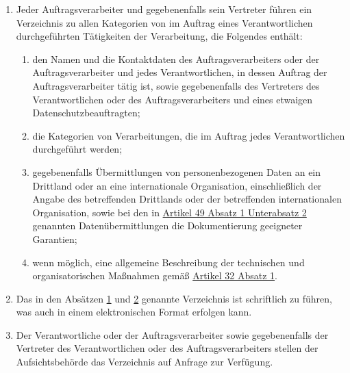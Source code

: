\begin{enumerate}
\begin{enumerate}
  \end{enumerate}

  \item Jeder Auftragsverarbeiter und gegebenenfalls sein Vertreter führen ein Verzeichnis zu allen Kategorien von im
   Auftrag eines Verantwortlichen durchgeführten Tätigkeiten der Verarbeitung, die Folgendes enthält:
  \label{itm:30-2}

  \begin{enumerate}
  
    \item den Namen und die Kontaktdaten des Auftragsverarbeiters oder der Auftragsverarbeiter und jedes
     Verantwortlichen, in dessen Auftrag der Auftragsverarbeiter tätig ist, sowie gegebenenfalls des Vertreters des
     Verantwortlichen oder des Auftragsverarbeiters und eines etwaigen Datenschutzbeauftragten;
    \label{itm:30-2a}

    \item die Kategorien von Verarbeitungen, die im Auftrag jedes Verantwortlichen durchgeführt werden;
    \label{itm:30-2b}

    \item gegebenenfalls Übermittlungen von personenbezogenen Daten an ein Drittland oder an eine internationale
     Organisation, einschließlich der Angabe des betreffenden Drittlands oder der betreffenden internationalen
     Organisation, sowie bei den in \hyperref[itm:49-1-2]{Artikel 49 Absatz 1 Unterabsatz 2} genannten
     Datenübermittlungen die Dokumentierung geeigneter Garantien;
    \label{itm:30-2c}

    \item wenn möglich, eine allgemeine Beschreibung der technischen und organisatorischen Maßnahmen gemäß \hyperref
     [itm:32-1]{Artikel 32 Absatz 1}.
    \label{itm:30-2d}

  \end{enumerate}

  \item Das in den Absätzen \hyperref[itm:30-1]{1} und \hyperref[itm:30-2]{2} genannte Verzeichnis ist schriftlich zu
   führen, was auch in einem elektronischen Format erfolgen kann.
  \label{itm:30-3}

  \item Der Verantwortliche oder der Auftragsverarbeiter sowie gegebenenfalls der Vertreter des Verantwortlichen oder
   des Auftragsverarbeiters stellen der Aufsichtsbehörde das Verzeichnis auf Anfrage zur Verfügung.
  \label{itm:30-4}


\end{enumerate}
